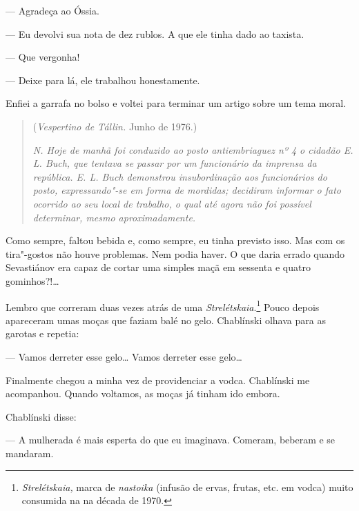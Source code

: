 --- Agradeça ao Óssia.

--- Eu devolvi sua nota de dez rublos. A que ele tinha dado ao taxista.

--- Que vergonha!

--- Deixe para lá, ele trabalhou honestamente.

Enfiei a garrafa no bolso e voltei para terminar um artigo sobre um tema
moral.

\clearpage
\thispagestyle{empty}

\movetooddpage
\begin{center}
{}
\end{center}

\begin{quotation}
\begin{flushright}
(\emph{Vespertino de Tállin.} Junho de 1976.)
\end{flushright}
\vspace{4pt}
\noindent\emph{N. Hoje de manhã foi conduzido ao posto
antiembriaguez nº 4 o cidadão E. L. Buch, que tentava se passar por um
funcionário da imprensa da república. E. L. Buch demonstrou
insubordinação aos funcionários do posto, expressando"-se em forma de
mordidas; decidiram informar o fato ocorrido ao seu local de trabalho, o
qual até agora não foi possível determinar, mesmo aproximadamente.}
\end{quotation}

Como sempre, faltou bebida e, como sempre, eu tinha previsto isso. Mas
com os tira"-gostos não houve problemas. Nem podia haver. O que daria
errado quando Sevastiánov era capaz de cortar uma simples maçã em
sessenta e quatro gominhos?!\ldots{}

Lembro que correram duas vezes atrás de uma
\emph{Strelétskaia}.\footnote{\emph{Strelétskaia,} marca de
  \emph{nastoika} (infusão de ervas, frutas, etc. em vodca) muito
  consumida na  na década de 1970.} Pouco depois apareceram umas
moças que faziam balé no gelo. Chablínski olhava para as garotas e
repetia:

--- Vamos derreter esse gelo\ldots{} Vamos derreter esse gelo\ldots{}

Finalmente chegou a minha vez de providenciar a vodca. Chablínski me
acompanhou. Quando voltamos, as moças já tinham ido embora.

Chablínski disse:

--- A mulherada é mais esperta do que eu imaginava. Comeram, beberam e
se mandaram.

